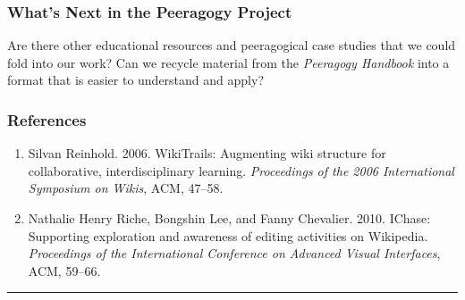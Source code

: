 \hypertarget{whats-next-in-the-peeragogy-project}{%
\subsubsection{What's Next in the Peeragogy
Project}\label{whats-next-in-the-peeragogy-project}}

Are there other educational resources and peeragogical case studies that
we could fold into our work? Can we recycle material from the
\emph{Peeragogy Handbook} into a format that is easier to understand and
apply?

\hypertarget{references}{%
\subsubsection{References}\label{references}}

\begin{enumerate}
\def\labelenumi{\arabic{enumi}.}
\item
  Silvan Reinhold. 2006. WikiTrails: Augmenting wiki structure for
  collaborative, interdisciplinary learning. \emph{Proceedings of the
  2006 International Symposium on Wikis}, ACM, 47--58.
\item
  Nathalie Henry Riche, Bongshin Lee, and Fanny Chevalier. 2010. IChase:
  Supporting exploration and awareness of editing activities on
  Wikipedia. \emph{Proceedings of the International Conference on
  Advanced Visual Interfaces}, ACM, 59--66.
\end{enumerate}

\begin{center}\rule{0.5\linewidth}{0.5pt}\end{center}
